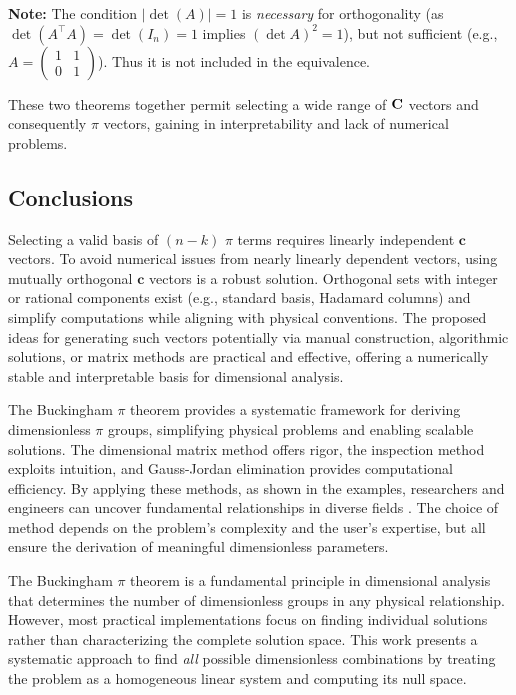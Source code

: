 \documentclass[
	11pt, %
	fleqn, %
	a4paper, %
]{LegrandOrangeBook}
\begin{document}
\textbf{Note:} The condition $|\det(A)| = 1$ is \textit{necessary} for orthogonality (as $\det(A^\top A) = \det(I_n) = 1$ implies $(\det A)^2 = 1$), but not sufficient (e.g., $A = \begin{pmatrix} 1 & 1 \\ 0 & 1 \end{pmatrix}$). Thus it is not included in the equivalence.

These two theorems together permit selecting a wide range of ${\bf C}$ vectors and consequently ${\pi}$ vectors, gaining in interpretability and lack of numerical problems.

\subsection{Conclusions}
\label{sec:conclusion}
Selecting a valid basis of $(n - k)$ $\pi$ terms requires linearly independent $\mathbf{c}$ vectors. To avoid numerical issues from nearly linearly dependent vectors, using mutually orthogonal $\mathbf{c}$ vectors is a robust solution. Orthogonal sets with integer or rational components exist (e.g., standard basis, Hadamard columns) and simplify computations while aligning with physical conventions. The proposed ideas for generating such vectors potentially via manual construction, algorithmic solutions, or matrix methods are practical and effective, offering a numerically stable and interpretable basis for dimensional analysis.

The Buckingham $\pi$ theorem provides a systematic framework for deriving dimensionless $\pi$ groups, simplifying physical problems and enabling scalable solutions. The dimensional matrix method offers rigor, the inspection method exploits intuition, and Gauss-Jordan elimination provides computational efficiency. By applying these methods, as shown in the examples, researchers and engineers can uncover fundamental relationships in diverse fields \cite{Sonin2004}. The choice of method depends on the problem's complexity and the user's expertise, but all ensure the derivation of meaningful dimensionless parameters.


The Buckingham $\pi$ theorem is a fundamental principle in dimensional analysis that determines the number of dimensionless groups in any physical relationship. However, most practical implementations focus on finding individual solutions rather than characterizing the complete solution space. This work presents a systematic approach to find \emph{all} possible dimensionless combinations by treating the problem as a homogeneous linear system and computing its null space.
\end{document}
